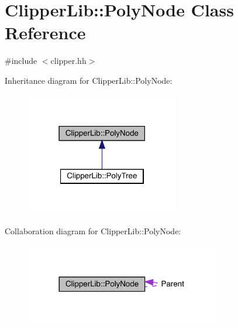 \hypertarget{class_clipper_lib_1_1_poly_node}{}\section{Clipper\+Lib\+::Poly\+Node Class Reference}
\label{class_clipper_lib_1_1_poly_node}


{\ttfamily \#include $<$clipper.\+hh$>$}



Inheritance diagram for Clipper\+Lib\+::Poly\+Node\+:
\nopagebreak
\begin{figure}[H]
\begin{center}
\leavevmode
\includegraphics[width=190pt]{class_clipper_lib_1_1_poly_node__inherit__graph}
\end{center}
\end{figure}


Collaboration diagram for Clipper\+Lib\+::Poly\+Node\+:
\nopagebreak
\begin{figure}[H]
\begin{center}
\leavevmode
\includegraphics[width=240pt]{class_clipper_lib_1_1_poly_node__coll__graph}
\end{center}
\end{figure}

